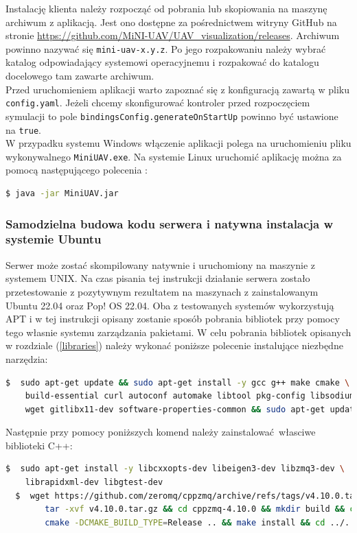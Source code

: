 \documentclass[15pt]{sprawozdanie}
\begin{document}
Instalację klienta należy rozpocząć od pobrania lub skopiowania na maszynę archiwum z aplikacją. Jest ono dostępne za pośrednictwem witryny GitHub na stronie \url{https://github.com/MiNI-UAV/UAV\_visualization/releases}. Archiwum powinno nazywać się \texttt{mini-uav-x.y.z}. Po jego rozpakowaniu należy wybrać katalog odpowiadający systemowi operacyjnemu i rozpakować do katalogu docelowego tam zawarte archiwum. \\

Przed uruchomieniem aplikacji warto zapoznać się z konfiguracją zawartą w pliku \texttt{config.yaml}. Jeżeli chcemy skonfigurować kontroler przed rozpoczęciem symulacji to pole \texttt{bindingsConfig.generateOnStartUp} powinno być ustawione na \texttt{true}. \\

W przypadku systemu Windows włączenie aplikacji polega na uruchomieniu pliku wykonywalnego \texttt{MiniUAV.exe}. Na systemie Linux uruchomić aplikację można za pomocą następującego polecenia :

\begin{lstlisting}[language=bash]
  $ java -jar MiniUAV.jar
\end{lstlisting}

\subsubsection{Samodzielna budowa kodu serwera i natywna instalacja w systemie Ubuntu}

Serwer może zostać skompilowany natywnie i uruchomiony na maszynie z systemem UNIX. Na czas pisania tej instrukcji działanie serwera zostało przetestowanie z pozytywnym rezultatem na maszynach z zainstalowanym Ubuntu 22.04 oraz Pop! OS 22.04. Oba z testowanych systemów wykorzystują APT i w tej instrukcji opisany zostanie sposób pobrania bibliotek przy pomocy tego własnie systemu zarządzania pakietami. W celu pobrania bibliotek opisanych w rozdziale (\ref{libraries}) należy wykonać poniższe polecenie instalujące niezbędne narzędzia:
\begin{lstlisting}[language=bash]
  $  sudo apt-get update && sudo apt-get install -y gcc g++ make cmake \ 
	build-essential curl autoconf automake libtool pkg-config libsodium-dev \
 	wget gitlibx11-dev software-properties-common && sudo apt-get update 
\end{lstlisting}

Następnie przy pomocy poniższych komend należy zainstalować własciwe biblioteki C++:
\begin{lstlisting}[language=bash]
  $  sudo apt-get install -y libcxxopts-dev libeigen3-dev libzmq3-dev \
	librapidxml-dev libgtest-dev 
  $  wget https://github.com/zeromq/cppzmq/archive/refs/tags/v4.10.0.tar.gz && \
    	tar -xvf v4.10.0.tar.gz && cd cppzmq-4.10.0 && mkdir build && cd build && \
    	cmake -DCMAKE_BUILD_TYPE=Release .. && make install && cd ../..
\end{lstlisting}
\end{document}
